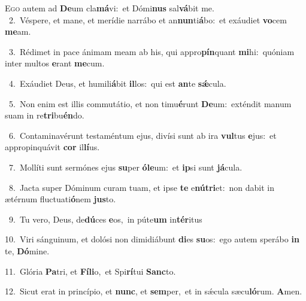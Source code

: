 \lettrine{\initial\textcolor{\initialcolor}{E}}{go} autem ad \textbf{De}\-um cla\-\textbf{má}\-vi:~\star et Dómi\textbf{nus} sal\-\textbf{vá}\-bit me.\\
{\numbfont\textcolor{\numbcolor}{~2.}}~Véspere, et mane, et merídie narrábo et an\-\textbf{nun}\-ti\-\textbf{á}\-bo:~\star et exáudiet \textbf{vo}\-cem \textbf{me}\-am.\par
{\numbfont\textcolor{\numbcolor}{~3.}}~Rédimet in pace ánimam meam ab his, qui appro\-\textbf{pín}\-quant \textbf{mi}\-hi:~\star quóniam inter multos \textbf{e}\-rant \textbf{me}\-cum.\par
{\numbfont\textcolor{\numbcolor}{~4.}}~Exáudiet Deus, et humili\-\textbf{á}\-bit \textbf{il}\-los:~\star qui est \textbf{an}\-te \textbf{sǽ}\-cula.\par
{\numbfont\textcolor{\numbcolor}{~5.}}~Non enim est illis commutátio, et non timu\-\textbf{é}\-runt \textbf{De}\-um:~\star exténdit manum suam in re\-\textbf{tri}\-bu\-\textbf{én}\-do.\par
{\numbfont\textcolor{\numbcolor}{~6.}}~Contaminavérunt testaméntum ejus, divísi sunt ab ira \textbf{vul}\-tus \textbf{e}\-jus:~\star et appropinquávit \textbf{cor} il\-\textbf{lí}\-us.\par
{\numbfont\textcolor{\numbcolor}{~7.}}~Mollíti sunt sermónes ejus \textbf{su}\-per \textbf{ó}\-\textbf{le}um:~\star et \textbf{ip}\-si sunt \textbf{já}\-cula.\par
{\numbfont\textcolor{\numbcolor}{~8.}}~Jacta super Dóminum curam tuam, et ipse \textbf{te} e\-\textbf{nú}\-\textbf{tri}et:~\star non dabit in ætérnum fluctuati\-\textbf{ó}\-nem \textbf{jus}\-to.\par
{\numbfont\textcolor{\numbcolor}{~9.}}~Tu vero, Deus, de\-\textbf{dú}\-ces \textbf{e}\-os,~\star in púte\textbf{um} in\-\textbf{tér}\-itus\par
{\numbfont\textcolor{\numbcolor}{10.}}~Viri sánguinum, et dolósi non dimidiábunt \textbf{di}\-es \textbf{su}\-os:~\star ego autem sperábo \textbf{in} te, \textbf{Dó}\-mine.\par
{\numbfont\textcolor{\numbcolor}{11.}}~Glória \textbf{Pa}\-tri, et \textbf{Fí}\-\textbf{li}o,~\star et Spi\-\textbf{rí}\-tui \textbf{Sanc}\-to.\par
{\numbfont\textcolor{\numbcolor}{12.}}~Sicut erat in princípio, et \textbf{nunc}\-, et \textbf{sem}\-per,~\star et in sǽcula sæcu\-\textbf{ló}\-rum. \textbf{A}\-men.\par
